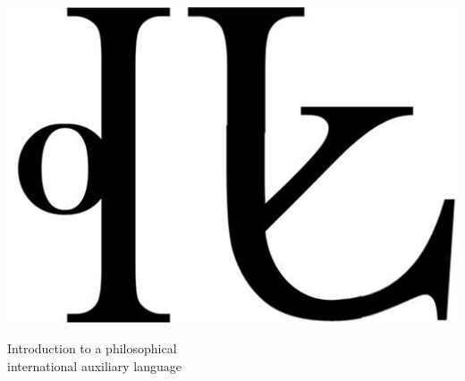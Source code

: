 


\thispagestyle{empty}
\setcounter{page}{-1}
\begin{center}
\includegraphics[scale=0.6]{./Images/LogoAtlan.jpeg}

	\hspace{0.7cm}

	{\large \hspace{-0.045cm}Introduction to a philosophical\\international auxiliary language}
\end{center}
\pagebreak
